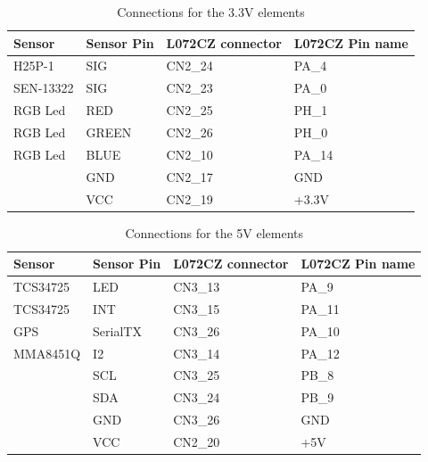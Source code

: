 \begin{table}[H]
    \begin{center}
        \begin{tabular}{|p{} | p{} | p{}| p{}|}
            \hline
            \textbf{Sensor} & \textbf{Sensor Pin} & \textbf{L072CZ connector} & \textbf{L072CZ Pin name}\\
            \hline
            H25P-1 & SIG & CN2\_24 & PA\_4 \\
            \hline
            SEN-13322 & SIG & CN2\_23 & PA\_0 \\
            \hline
            RGB Led & RED & CN2\_25 & PH\_1 \\
            \hline
            RGB Led & GREEN & CN2\_26 & PH\_0 \\
            \hline
            RGB Led & BLUE & CN2\_10 & PA\_14 \\
            \hline
             & GND & CN2\_17 & GND \\
            \hline
             & VCC & CN2\_19 & +3.3V \\
            \hline
        \end{tabular}
    \end{center}
    \caption{Connections for the 3.3V elements}
    \label{Connections3}
\end{table}
\begin{table}[H]
    \begin{center}
        \begin{tabular}{|p{} | p{} | p{}| p{}|}
            \hline
            \textbf{Sensor} & \textbf{Sensor Pin} & \textbf{L072CZ connector} & \textbf{L072CZ Pin name}\\
            \hline
            TCS34725 & LED & CN3\_13 & PA\_9 \\
            \hline
            TCS34725 & INT & CN3\_15 & PA\_11 \\
            \hline
            GPS & SerialTX & CN3\_26 & PA\_10 \\
            \hline
            MMA8451Q & I2 & CN3\_14 & PA\_12 \\
            \hline
             & SCL & CN3\_25 & PB\_8 \\
            \hline
             & SDA & CN3\_24 & PB\_9 \\
            \hline
             & GND & CN3\_26 & GND \\
            \hline
             & VCC & CN2\_20 & +5V \\
            \hline
        \end{tabular} 
    \end{center}
    \caption{Connections for the 5V elements}
    \label{Connections5}
\end{table}

